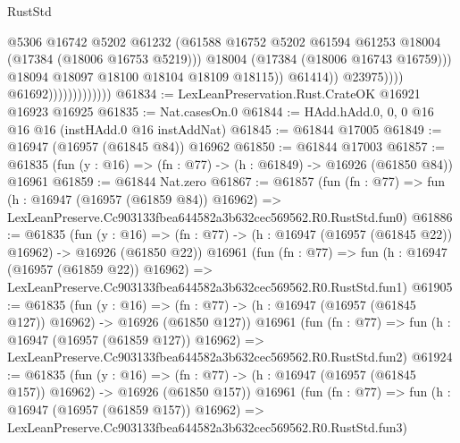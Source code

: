 \begin{lexlean}{RustStd}
\begin{coremodule}
                                                @5306
                                                @16742
                                                @5202
                                                @61232
                                                (@61588
                                                  @16752
                                                  @5202
                                                  @61594
                                                  @61253
                                                  @18004
                                                  (@17384 (@18006 @16753 @5219)))
                                                @18004
                                                (@17384 (@18006 @16743 @16759)))
                                              @18094
                                              @18097
                                              @18100
                                              @18104
                                              @18109
                                              @18115))
                                          @61414))
                                      @23975))))
                              @61692)))))))))))))
@61834 := LexLeanPreservation.Rust.CrateOK @16921 @16923 @16925
@61835 := Nat.casesOn.{0}
@61844 := HAdd.hAdd.{0, 0, 0} @16 @16 @16 (instHAdd.{0} @16 instAddNat)
@61845 := @61844 @17005
@61849 := @16947 (@16957 (@61845 @84)) @16962
@61850 := @61844 @17003
@61857 := @61835 (fun (y : @16) => (fn : @77) -> (h : @61849) -> @16926 (@61850 @84)) @16961
@61859 := @61844 Nat.zero
@61867 := @61857
    (fun (fn : @77) =>
    fun (h : @16947 (@16957 (@61859 @84)) @16962) =>
    LexLeanPreserve.Cc903133fbea644582a3b632cec569562.R0.RustStd.fun0)
@61886 := @61835
    (fun (y : @16) =>
    (fn : @77) -> (h : @16947 (@16957 (@61845 @22)) @16962) -> @16926 (@61850 @22))
    @16961
    (fun (fn : @77) =>
    fun (h : @16947 (@16957 (@61859 @22)) @16962) =>
    LexLeanPreserve.Cc903133fbea644582a3b632cec569562.R0.RustStd.fun1)
@61905 := @61835
    (fun (y : @16) =>
    (fn : @77) -> (h : @16947 (@16957 (@61845 @127)) @16962) -> @16926 (@61850 @127))
    @16961
    (fun (fn : @77) =>
    fun (h : @16947 (@16957 (@61859 @127)) @16962) =>
    LexLeanPreserve.Cc903133fbea644582a3b632cec569562.R0.RustStd.fun2)
@61924 := @61835
    (fun (y : @16) =>
    (fn : @77) -> (h : @16947 (@16957 (@61845 @157)) @16962) -> @16926 (@61850 @157))
    @16961
    (fun (fn : @77) =>
    fun (h : @16947 (@16957 (@61859 @157)) @16962) =>
    LexLeanPreserve.Cc903133fbea644582a3b632cec569562.R0.RustStd.fun3)

\end{coremodule}
\end{lexlean}
